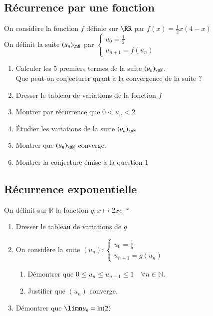 \documentclass[oneside,12pt]{article}          %
\begin{document}
\subsection{Récurrence par une fonction}
On considère la fonction $f$ définie sur $\RR$ par $f(x)=\frac{1}{2}x(4-x)$ \\
On définit la suite $(u_n)_{\nN}$ par $\begin{cases}u_0=\frac{1}{2}\\u_{n+1}=f(u_n)\end{cases}$
\begin{enumerate}
    \item Calculer les 5 premiers termes de la suite $(u_n)_{\nN}$.\\
    Que peut-on conjecturer quant à la convergence de la suite ?
    \item Dresser le tableau de variations de la fonction $f$
    \item Montrer par récurrence que $0< u_n< 2$
    \item Étudier les variations de la suite $(u_n)_{\nN}$
    \item Montrer que $(u_n)_{\nN}$ converge.
    \item Montrer la conjecture émise à la question 1
\end{enumerate}



\subsection{Récurrence exponentielle}
On définit sur $\mathbb{R}$ la fonction $g : x \mapsto 2xe^{-x}$
\begin{enumerate}
    \item Dresser le tableau de variations de $g$
    \item On considère la suite $(u_n) : \begin{cases}u_0=\frac{1}{5}\\u_{n+1}=g(u_n)\end{cases}$
    \begin{enumerate}
        \item Démontrer que $0 \leq u_n \leq u_{n+1} \leq 1 \quad \forall n \in \mathbb{N}$.
        \item Justifier que $(u_n)$ converge.
    \end{enumerate}
    \item Démontrer que $\limn u_n = \ln(2)$
\end{enumerate}
\end{document}
